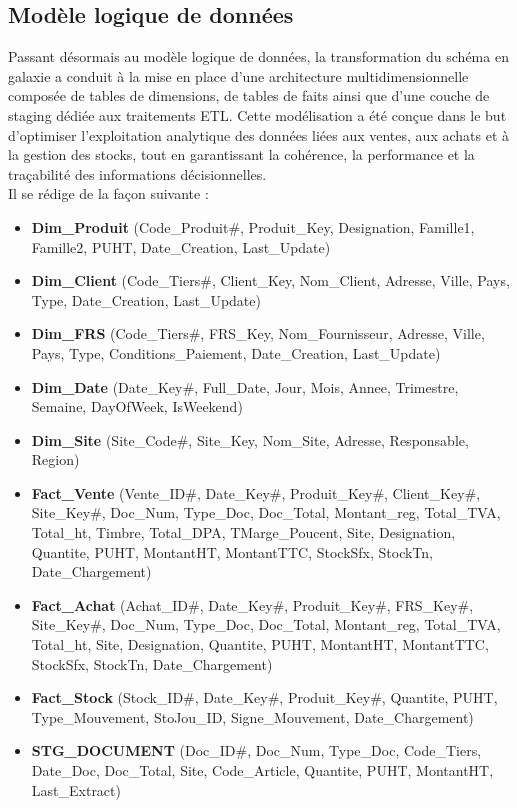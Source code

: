\subsection{Modèle logique de données }
Passant désormais au modèle logique de données, la transformation du schéma en galaxie a conduit à la mise en place d’une architecture multidimensionnelle composée de tables de dimensions, de tables de faits ainsi que d’une couche de staging dédiée aux traitements ETL. 
Cette modélisation a été conçue dans le but d’optimiser l’exploitation analytique des données liées aux ventes, aux achats et à la gestion des stocks, tout en garantissant la cohérence, la performance et la traçabilité des informations décisionnelles.\\
Il se rédige de la façon suivante : 
\begin{itemize}
    \item \textbf{Dim\_Produit} (Code\_Produit\#, Produit\_Key, Designation, Famille1, Famille2, PUHT, Date\_Creation, Last\_Update)
    \item \textbf{Dim\_Client} (Code\_Tiers\#, Client\_Key, Nom\_Client, Adresse, Ville, Pays, Type, Date\_Creation, Last\_Update)
    \item \textbf{Dim\_FRS }(Code\_Tiers\#, FRS\_Key, Nom\_Fournisseur, Adresse, Ville, Pays, Type, Conditions\_Paiement, Date\_Creation, Last\_Update)
    \item \textbf{Dim\_Date} (Date\_Key\#, Full\_Date, Jour, Mois, Annee, Trimestre, Semaine, DayOfWeek, IsWeekend)
    \item \textbf{Dim\_Site} (Site\_Code\#, Site\_Key, Nom\_Site, Adresse, Responsable, Region)
    \item \textbf{Fact\_Vente} (Vente\_ID\#, Date\_Key\#, Produit\_Key\#, Client\_Key\#, Site\_Key\#, Doc\_Num, Type\_Doc, Doc\_Total, Montant\_reg, Total\_TVA, Total\_ht, Timbre, Total\_DPA, TMarge\_Poucent, Site, Designation, Quantite, PUHT, MontantHT, MontantTTC, StockSfx, StockTn, Date\_Chargement)
    \item \textbf{Fact\_Achat} (Achat\_ID\#, Date\_Key\#, Produit\_Key\#, FRS\_Key\#, Site\_Key\#, Doc\_Num, Type\_Doc, Doc\_Total, Montant\_reg, Total\_TVA, Total\_ht, Site, Designation, Quantite, PUHT, MontantHT, MontantTTC, StockSfx, StockTn, Date\_Chargement)
    \item \textbf{Fact\_Stock} (Stock\_ID\#, Date\_Key\#, Produit\_Key\#, Quantite, PUHT, Type\_Mouvement, StoJou\_ID, Signe\_Mouvement, Date\_Chargement)
    \item \textbf{STG\_DOCUMENT} (Doc\_ID\#, Doc\_Num, Type\_Doc, Code\_Tiers, Date\_Doc, Doc\_Total, Site, Code\_Article, Quantite, PUHT, MontantHT, Last\_Extract)

\end{itemize}
